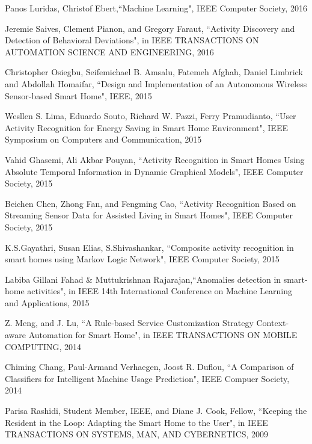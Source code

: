\cleardoublepage
{}
\begin{thebibliography}{99}


\bibitem{}Panos Luridas, Christof Ebert,``Machine Learning", IEEE Computer Society, 2016

\bibitem{}Jeremie Saives, Clement Pianon, and Gregory Faraut, ``Activity Discovery and Detection of Behavioral Deviations", in IEEE TRANSACTIONS ON AUTOMATION SCIENCE AND ENGINEERING, 2016

\bibitem{}Christopher Osiegbu, Seifemichael B. Amsalu, Fatemeh Afghah, Daniel Limbrick and Abdollah Homaifar, ``Design and Implementation of an Autonomous Wireless Sensor-based Smart Home", IEEE, 2015

\bibitem{}Wesllen S. Lima, Eduardo Souto, Richard W. Pazzi, Ferry Pramudianto, ``User Activity Recognition for Energy Saving in Smart Home Environment", IEEE Symposium on Computers and Communication, 2015

\bibitem{}Vahid Ghasemi, Ali Akbar Pouyan, ``Activity Recognition in Smart Homes Using Absolute Temporal Information in Dynamic Graphical Models", IEEE Computer Society, 2015

\bibitem{}Beichen Chen, Zhong Fan, and Fengming Cao, ``Activity Recognition Based on Streaming Sensor Data for Assisted Living in Smart Homes", IEEE Computer Society, 2015

\bibitem{}K.S.Gayathri, Susan Elias, S.Shivashankar, ``Composite activity recognition in smart homes using Markov Logic Network", IEEE Computer Society, 2015

\bibitem{}Labiba Gillani Fahad \& Muttukrishnan Rajarajan,``Anomalies detection in  smart-home activities", in IEEE 14th International Conference on Machine Learning and Applications, 2015

\bibitem{}Z. Meng, and J. Lu, ``A Rule-based Service Customization Strategy Context- aware Automation for Smart Home", in IEEE TRANSACTIONS ON MOBILE COMPUTING, 2014

\bibitem{}Chiming Chang, Paul-Armand Verhaegen, Joost R. Duflou, ``A Comparison of Classifiers for Intelligent Machine Usage Prediction", IEEE Compuer Society, 2014

\bibitem{}Parisa Rashidi, Student Member, IEEE, and Diane J. Cook, Fellow, ``Keeping the Resident in the Loop: Adapting the Smart Home to the User", in IEEE TRANSACTIONS ON SYSTEMS, MAN, AND CYBERNETICS, 2009

\end{thebibliography}